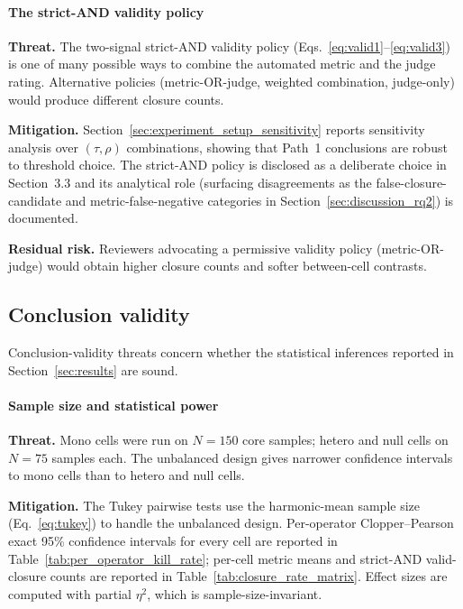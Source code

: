 \paragraph{The strict-AND validity policy}

\textbf{Threat.} The two-signal strict-AND validity policy (Eqs.~\ref{eq:valid1}--\ref{eq:valid3}) is one of many possible ways to combine the automated metric and the judge rating. Alternative policies (metric-OR-judge, weighted combination, judge-only) would produce different closure counts.

\textbf{Mitigation.} Section~\ref{sec:experiment_setup_sensitivity} reports sensitivity analysis over $(\tau, \rho)$ combinations, showing that Path~1 conclusions are robust to threshold choice. The strict-AND policy is disclosed as a deliberate choice in Section~3.3 and its analytical role (surfacing disagreements as the false-closure-candidate and metric-false-negative categories in Section~\ref{sec:discussion_rq2}) is documented.

\textbf{Residual risk.} Reviewers advocating a permissive validity policy (metric-OR-judge) would obtain higher closure counts and softer between-cell contrasts.

\subsection{Conclusion validity}

Conclusion-validity threats concern whether the statistical inferences reported in Section~\ref{sec:results} are sound.

\paragraph{Sample size and statistical power}

\textbf{Threat.} Mono cells were run on $N = 150$ core samples; hetero and null cells on $N = 75$ samples each. The unbalanced design gives narrower confidence intervals to mono cells than to hetero and null cells.

\textbf{Mitigation.} The Tukey pairwise tests use the harmonic-mean sample size (Eq.~\ref{eq:tukey}) to handle the unbalanced design. Per-operator Clopper--Pearson exact 95\% confidence intervals for every cell are reported in Table~\ref{tab:per_operator_kill_rate}; per-cell metric means and strict-AND valid-closure counts are reported in Table~\ref{tab:closure_rate_matrix}. Effect sizes are computed with partial $\eta^2$, which is sample-size-invariant.

